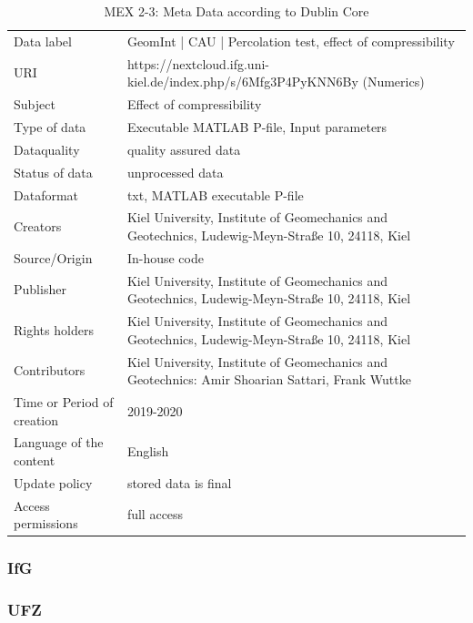 \begin{table}[!ht]
\caption{MEX 2-3: Meta Data according to Dublin Core}
\label{tab:dms-mex2-3}
\small
\begin{tabular}{R{3cm}|L{7cm}}
\hline
%
Data label & GeomInt | CAU | Percolation test, effect of compressibility\\
URI &  https://nextcloud.ifg.uni-kiel.de/index.php/s/6Mfg3P4PyKNN6By (Numerics)
\\
Subject  &  Effect of compressibility\\
Type of data  & Executable MATLAB P-file, Input parameters\\
Dataquality  &  quality assured data \\
Status of data  &  unprocessed data\\
Dataformat  & txt, MATLAB executable P-file\\
Creators  &  Kiel University, Institute of Geomechanics and Geotechnics, Ludewig-Meyn-Stra\ss e 10, 24118, Kiel\\
Source/Origin & In-house code \\
Publisher  &  Kiel University, Institute of Geomechanics and Geotechnics, Ludewig-Meyn-Stra\ss e 10, 24118, Kiel \\
Rights holders &  Kiel University, Institute of Geomechanics and Geotechnics, Ludewig-Meyn-Stra\ss e 10, 24118, Kiel \\
Contributors &   Kiel University, Institute of Geomechanics and Geotechnics: Amir Shoarian Sattari, Frank Wuttke \\
Time or Period of creation &  2019-2020\\
Language of the content &  English\\
Update policy &  stored data is final\\
Access permissions & full access\\
%
\hline
\end{tabular}
\end{table}

\subsubsection*{IfG}
\subsubsection*{UFZ}

